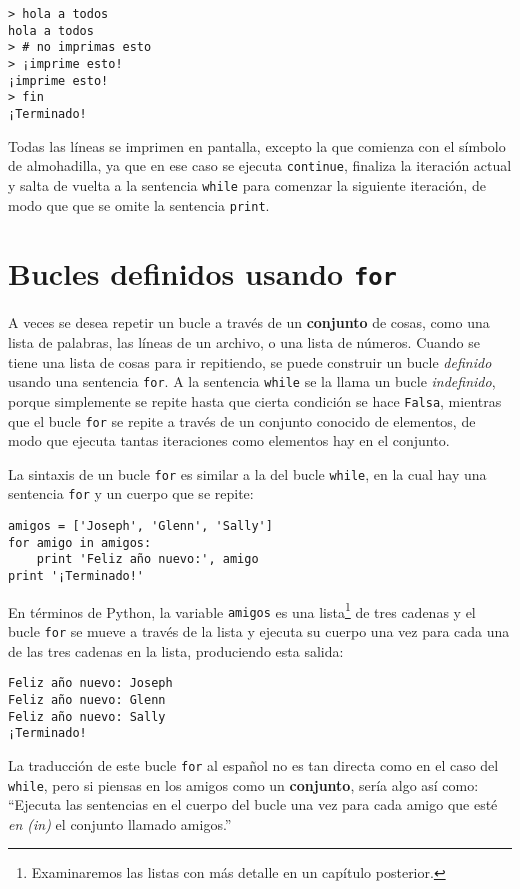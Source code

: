 \beforeverb
\begin{verbatim}
> hola a todos
hola a todos
> # no imprimas esto
> ¡imprime esto!
¡imprime esto!
> fin
¡Terminado!
\end{verbatim}
\afterverb
%
Todas las líneas se imprimen en pantalla, excepto la que comienza con el símbolo
de almohadilla, ya que en ese caso se ejecuta {\tt continue}, finaliza
la iteración actual y salta de vuelta
a la sentencia {\tt while} para comenzar la siguiente iteración, de modo que
que se omite la sentencia {\tt print}.

\section{Bucles definidos usando {\tt for} }

A veces se desea repetir un bucle a través de un {\bf conjunto} de cosas, como
una lista de palabras, las líneas de un archivo, o una lista de números.
Cuando se tiene una lista de cosas para ir repitiendo, se puede
construir un bucle \emph{definido} usando una sentencia {\tt for}.
A la sentencia {\tt while} se la llama un bucle \emph{indefinido},
porque simplemente se repite hasta que cierta condición se hace {\tt Falsa},
mientras que el bucle {\tt for} se repite a través de un
conjunto conocido de elementos, de modo que ejecuta tantas iteraciones como
elementos hay en el conjunto.

La sintaxis de un bucle {\tt for} es similar a la del bucle {\tt while},
en la cual hay una sentencia {\tt for} y un cuerpo que se repite:

\beforeverb
\begin{verbatim}
amigos = ['Joseph', 'Glenn', 'Sally']
for amigo in amigos:
    print 'Feliz año nuevo:', amigo
print '¡Terminado!'
\end{verbatim}
\afterverb
%
En términos de Python,
la variable {\tt amigos} es una lista\footnote{Examinaremos
las listas con más detalle en un capítulo posterior.}
de tres cadenas y el bucle {\tt for}
se mueve a través de la lista y ejecuta su cuerpo una vez
para cada una de las tres cadenas en la lista, produciendo
esta salida:

\beforeverb
\begin{verbatim}
Feliz año nuevo: Joseph
Feliz año nuevo: Glenn
Feliz año nuevo: Sally
¡Terminado!
\end{verbatim}
\afterverb
%

La traducción de este bucle {\tt for} al español no es tan directa como
en el caso del {\tt while}, pero si piensas en los amigos como un {\bf conjunto},
sería algo así como: ``Ejecuta las sentencias en el cuerpo del bucle
una vez para cada amigo que esté \emph{en (in)} el conjunto llamado amigos.''

